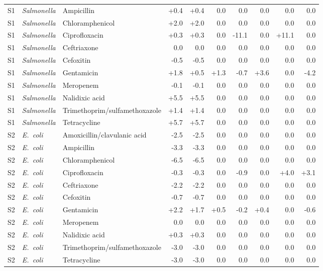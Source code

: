 {\begin{longtable}{lllrrrrrrr}
S1 & \textit{Salmonella} & Ampicillin & +0.4 & +0.4 & 0.0 & 0.0 & 0.0 & 0.0 & 0.0 \\
S1 & \textit{Salmonella} & Chloramphenicol & +2.0 & +2.0 & 0.0 & 0.0 & 0.0 & 0.0 & 0.0 \\
S1 & \textit{Salmonella} & Ciprofloxacin & +0.3 & +0.3 & 0.0 & -11.1 & 0.0 & +11.1 & 0.0 \\
S1 & \textit{Salmonella} & Ceftriaxone & 0.0 & 0.0 & 0.0 & 0.0 & 0.0 & 0.0 & 0.0 \\
S1 & \textit{Salmonella} & Cefoxitin & -0.5 & -0.5 & 0.0 & 0.0 & 0.0 & 0.0 & 0.0 \\
S1 & \textit{Salmonella} & Gentamicin & +1.8 & +0.5 & +1.3 & -0.7 & +3.6 & 0.0 & -4.2 \\
S1 & \textit{Salmonella} & Meropenem & -0.1 & -0.1 & 0.0 & 0.0 & 0.0 & 0.0 & 0.0 \\
S1 & \textit{Salmonella} & Nalidixic acid & +5.5 & +5.5 & 0.0 & 0.0 & 0.0 & 0.0 & 0.0 \\
S1 & \textit{Salmonella} & Trimethoprim/sulfamethoxazole & +1.4 & +1.4 & 0.0 & 0.0 & 0.0 & 0.0 & 0.0 \\
S1 & \textit{Salmonella} & Tetracycline & +5.7 & +5.7 & 0.0 & 0.0 & 0.0 & 0.0 & 0.0 \\
S2 & \textit{E.~coli} & Amoxicillin/clavulanic acid & -2.5 & -2.5 & 0.0 & 0.0 & 0.0 & 0.0 & 0.0 \\
S2 & \textit{E.~coli} & Ampicillin & -3.3 & -3.3 & 0.0 & 0.0 & 0.0 & 0.0 & 0.0 \\
S2 & \textit{E.~coli} & Chloramphenicol & -6.5 & -6.5 & 0.0 & 0.0 & 0.0 & 0.0 & 0.0 \\
S2 & \textit{E.~coli} & Ciprofloxacin & -0.3 & -0.3 & 0.0 & -0.9 & 0.0 & +4.0 & +3.1 \\
S2 & \textit{E.~coli} & Ceftriaxone & -2.2 & -2.2 & 0.0 & 0.0 & 0.0 & 0.0 & 0.0 \\
S2 & \textit{E.~coli} & Cefoxitin & -0.7 & -0.7 & 0.0 & 0.0 & 0.0 & 0.0 & 0.0 \\
S2 & \textit{E.~coli} & Gentamicin & +2.2 & +1.7 & +0.5 & -0.2 & +0.4 & 0.0 & -0.6 \\
S2 & \textit{E.~coli} & Meropenem & 0.0 & 0.0 & 0.0 & 0.0 & 0.0 & 0.0 & 0.0 \\
S2 & \textit{E.~coli} & Nalidixic acid & +0.3 & +0.3 & 0.0 & 0.0 & 0.0 & 0.0 & 0.0 \\
S2 & \textit{E.~coli} & Trimethoprim/sulfamethoxazole & -3.0 & -3.0 & 0.0 & 0.0 & 0.0 & 0.0 & 0.0 \\
S2 & \textit{E.~coli} & Tetracycline & -3.0 & -3.0 & 0.0 & 0.0 & 0.0 & 0.0 & 0.0 \\

\end{longtable}}
